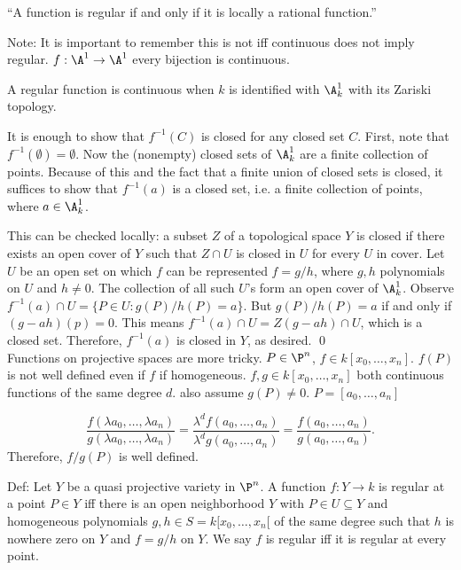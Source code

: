 ``A function is regular if and only if it is locally a rational function.''

Note: It is important to remember this is not iff continuous does not imply regular. $f: \A^1 \to \A^1$ every bijection is continuous. 








\begin{lem}
A regular function is continuous when $k$ is identified with $\A^1_k$ with its Zariski topology. 
\end{lem}

\pf It is enough to show that $f^{-1}(C)$ is closed for any closed set $C$. First, note that $f^{-1}(\emptyset)= \emptyset$. Now the (nonempty) closed sets of $\A_k^1$ are a finite collection of points. Because of this and the fact that a finite union of closed sets is closed, it suffices to show that $f^{-1}(a)$ is a closed set, i.e. a finite collection of points, where $a \in \A_k^1$. 

This can be checked locally: a subset $Z$ of a topological space $Y$ is closed if there exists an open cover of $Y$ such that $Z \cap U$ is closed in $U$ for every $U$ in cover. Let $U$ be an open set on which $f$ can be represented $f= g/h$, where $g, h$ polynomials on $U$ and $h \neq 0$. The collection of all such $U$'s form an open cover of $\A_k^1$. Observe $f^{-1}(a) \cap U= \{ P \in U \colon g(P)/h(P)= a\}$. But $g(P) / h(P)= a$ if and only if $(g - ah)(p)= 0$. This means $f^{-1}(a) \cap U= Z(g - ah) \cap U$, which is a closed set. Therefore, $f^{-1}(a)$ is closed in $Y$, as desired. \qed \\








Functions on projective spaces are more tricky. $P \in \P^n$, $f \in k[x_0,\ldots,x_n]$. $f(P)$ is not well defined even if $f$ if homogeneous. $f,g \in k[x_0,\ldots,x_n]$ both continuous functions of the same degree $d$. also assume $g(P) \neq 0$. $P= [a_0,\ldots,a_n]$

	\[
	\dfrac{f(\lambda a_0,\ldots,\lambda a_n)}{g(\lambda a_0,\ldots,\lambda a_n)}= \dfrac{\lambda^d f(a_0,\ldots,a_n)}{\lambda^d g(a_0,\ldots,a_n)}= \dfrac{f(a_0,\ldots,a_n)}{g(a_0,\ldots,a_n)}.
	\]
Therefore, $f/g(P)$ is well defined. 


Def: Let $Y$ be a quasi projective variety in $\P^n$. A function $f: Y \to k$ is regular at a point $P \in Y$ iff there is an open neighborhood $Y$ with $P \in U \subseteq Y$ and homogeneous polynomials $g,h \in S= k[x_0,\ldots,x_n[$ of the same degree such that $h$ is nowhere zero on  $Y$ and $f=g/h$ on $Y$. We say $f$ is regular iff it is regular at every point. 


